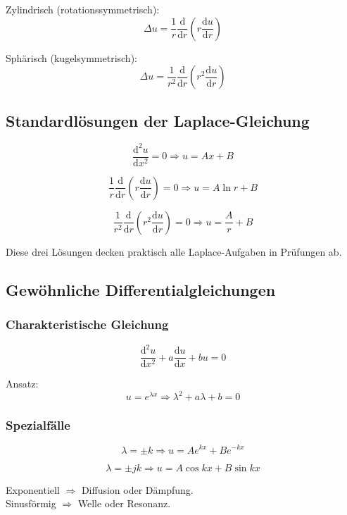 \documentclass[a4paper]{article}
\renewcommand{\dd}{\mathrm{d}}
\begin{document}
Zylindrisch (rotationssymmetrisch):
\[
\Delta u=\frac{1}{r}\frac{\dd}{\dd r}\left(r\frac{\dd u}{\dd r}\right)
\]

Sphärisch (kugelsymmetrisch):
\[
\Delta u=\frac{1}{r^2}\frac{\dd}{\dd r}
\left(r^2\frac{\dd u}{\dd r}\right)
\]

\subsection{Standardlösungen der Laplace-Gleichung}

\[
\frac{\dd^2 u}{\dd x^2}=0
\Rightarrow u=Ax+B
\]

\[
\frac{1}{r}\frac{\dd}{\dd r}\left(r\frac{\dd u}{\dd r}\right)=0
\Rightarrow u=A\ln r+B
\]

\[
\frac{1}{r^2}\frac{\dd}{\dd r}\left(r^2\frac{\dd u}{\dd r}\right)=0
\Rightarrow u=\frac{A}{r}+B
\]

\begin{merke}
Diese drei Lösungen decken praktisch alle Laplace-Aufgaben in Prüfungen ab.
\end{merke}

\subsection{Gewöhnliche Differentialgleichungen}

\subsubsection{Charakteristische Gleichung}

\[
\frac{\dd^2 u}{\dd x^2}+a\frac{\dd u}{\dd x}+bu=0
\]

Ansatz:
\[
u=e^{\lambda x}
\Rightarrow \lambda^2+a\lambda+b=0
\]

\subsubsection{Spezialfälle}

\[
\lambda=\pm k \Rightarrow u=Ae^{kx}+Be^{-kx}
\]

\[
\lambda=\pm jk \Rightarrow u=A\cos kx+B\sin kx
\]

\begin{schema}
Exponentiell $\Rightarrow$ Diffusion oder Dämpfung.\\
Sinusförmig $\Rightarrow$ Welle oder Resonanz.
\end{schema}
\end{document}
